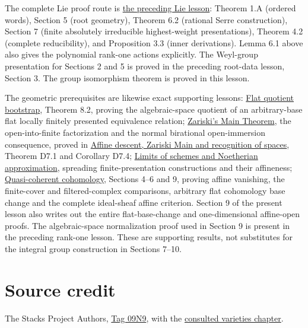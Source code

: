 \documentclass[11pt,a4paper,openany]{report}
\begin{document}
The complete Lie proof route is \href{https://github.com/KokunoYumeto/open-math-courses/blob/main/docs/courses/AG-RG/AG-RG-S06.md}{the preceding Lie lesson}: Theorem 1.A (ordered words), Section 5 (root geometry), Theorem 6.2 (rational Serre construction), Section 7 (finite absolutely irreducible highest-weight presentations), Theorem 4.2 (complete reducibility), and Proposition 3.3 (inner derivations). Lemma 6.1 above also gives the polynomial rank-one actions explicitly. The Weyl-group presentation for Sections 2 and 5 is proved in the preceding root-data lesson, Section 3. The group isomorphism theorem is proved in this lesson.

The geometric prerequisites are likewise exact supporting lessons: \href{https://github.com/KokunoYumeto/open-math-courses/blob/main/docs/courses/AG-RG/AG-RG-S07.md}{Flat quotient bootstrap}, Theorem 8.2, proving the algebraic-space quotient of an arbitrary-base flat locally finitely presented equivalence relation; \href{https://github.com/KokunoYumeto/open-math-courses/blob/main/docs/courses/AG-MO/AG-MO-12.html}{Zariski's Main Theorem}, the open-into-finite factorization and the normal birational open-immersion consequence, proved in \href{https://github.com/KokunoYumeto/open-math-courses/blob/main/docs/courses/AG-RG/AG-RG-S04.md}{Affine descent, Zariski Main and recognition of spaces}, Theorem D7.1 and Corollary D7.4; \href{https://github.com/KokunoYumeto/open-math-courses/blob/main/docs/courses/AG-MO/AG-MO-03.html}{Limits of schemes and Noetherian approximation}, spreading finite-presentation constructions and their affineness; \href{https://github.com/KokunoYumeto/open-math-courses/blob/main/docs/courses/AG-RG/AG-RG-S01.md}{Quasi-coherent cohomology}, Sections 4--6 and 9, proving affine vanishing, the finite-cover and filtered-complex comparisons, arbitrary flat cohomology base change and the complete ideal-sheaf affine criterion. Section 9 of the present lesson also writes out the entire flat-base-change and one-dimensional affine-open proofs. The algebraic-space normalization proof used in Section 9 is present in the preceding rank-one lesson. These are supporting results, not substitutes for the integral group construction in Sections 7--10.

\section{Source credit}\label{AG-RG-05-source-credit}

The Stacks Project Authors, \href{https://stacks.math.columbia.edu/tag/09N9}{Tag 09N9}, with the \href{https://github.com/KokunoYumeto/unofficial-stacks-project-ai-drafts/blob/565b10e987aba5969b21145a0833f42d69f96790/varieties.tex}{consulted varieties chapter}.
\end{document}
